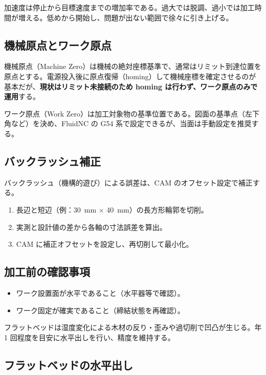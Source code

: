 \documentclass[uplatex,dvipdfmx]{ujarticle}
\begin{document}
加速度は停止から目標速度までの増加率である。過大では脱調、過小では加工時間が増える。低めから開始し、問題が出ない範囲で徐々に引き上げる。

\subsection{機械原点とワーク原点}

機械原点（Machine Zero）は機械の絶対座標基準で、通常はリミット到達位置を原点とする。電源投入後に原点復帰（homing）して機械座標を確定させるのが基本だが、\textbf{現状はリミット未接続のため homing は行わず、ワーク原点のみで運用}する。

ワーク原点（Work Zero）は加工対象物の基準位置である。図面の基準点（左下角など）を決め、FluidNC の G54 系で設定できるが、当面は手動設定を推奨する。

\subsection{バックラッシュ補正}

バックラッシュ（機構的遊び）による誤差は、CAM のオフセット設定で補正する。

\begin{enumerate}
  \item 長辺と短辺（例：\SI{30}{\milli\meter} $\times$ \SI{40}{\milli\meter}）の長方形輪郭を切削。
  \item 実測と設計値の差から各軸の寸法誤差を算出。
  \item CAM に補正オフセットを設定し、再切削して最小化。
\end{enumerate}

\subsection{加工前の確認事項}

\begin{itemize}
  \item ワーク設置面が水平であること（水平器等で確認）。
  \item ワーク固定が確実であること（締結状態を再確認）。
\end{itemize}

フラットベッドは湿度変化による木材の反り・歪みや過切削で凹凸が生じる。年 1 回程度を目安に水平出しを行い、精度を維持する。

\subsection{フラットベッドの水平出し}
\end{document}
